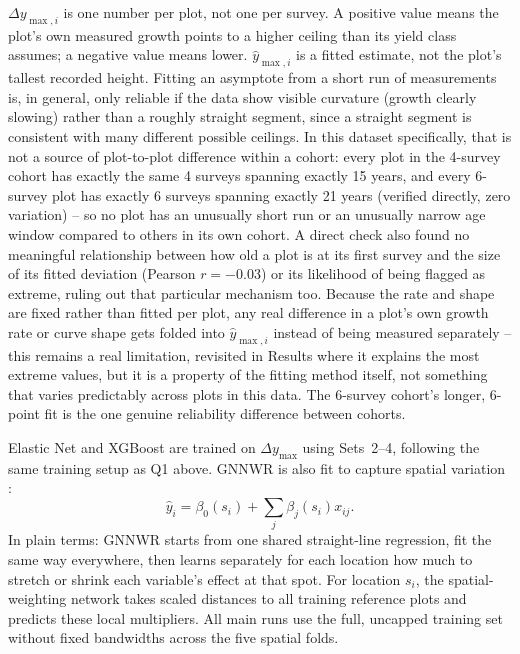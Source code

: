 \documentclass[logo,msc,ai]{infthesis}           %
\begin{document}
$\Delta y_{\max,i}$ is one number per plot, not one per survey. A positive value means the plot's own measured growth points to a higher ceiling than its yield class assumes; a negative value means lower. $\hat y_{\max,i}$ is a fitted estimate, not the plot's tallest recorded height. Fitting an asymptote from a short run of measurements is, in general, only reliable if the data show visible curvature (growth clearly slowing) rather than a roughly straight segment, since a straight segment is consistent with many different possible ceilings. In this dataset specifically, that is not a source of plot-to-plot difference within a cohort: every plot in the 4-survey cohort has exactly the same 4 surveys spanning exactly 15 years, and every 6-survey plot has exactly 6 surveys spanning exactly 21 years (verified directly, zero variation) -- so no plot has an unusually short run or an unusually narrow age window compared to others in its own cohort. A direct check also found no meaningful relationship between how old a plot is at its first survey and the size of its fitted deviation (Pearson $r=-0.03$) or its likelihood of being flagged as extreme, ruling out that particular mechanism too. Because the rate and shape are fixed rather than fitted per plot, any real difference in a plot's own growth rate or curve shape gets folded into $\hat y_{\max,i}$ instead of being measured separately -- this remains a real limitation, revisited in Results where it explains the most extreme values, but it is a property of the fitting method itself, not something that varies predictably across plots in this data. The 6-survey cohort's longer, 6-point fit is the one genuine reliability difference between cohorts.

Elastic Net and XGBoost are trained on $\Delta y_{\max}$ using Sets~2--4, following the same training setup as Q1 above. GNNWR is also fit to capture spatial variation %
:
\begin{equation}
\hat y_i=\beta_0(s_i)+\sum_j\beta_j(s_i)x_{ij}.
\label{eq:gnnwr}
\end{equation}
In plain terms: GNNWR starts from one shared straight-line regression, fit the same way everywhere, then learns separately for each location how much to stretch or shrink each variable's effect at that spot. For location $s_i$, the spatial-weighting network takes scaled distances to all training reference plots and predicts these local multipliers. All main runs use the full, uncapped training set without fixed bandwidths across the five spatial folds.
\end{document}
